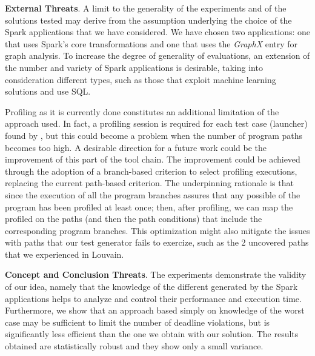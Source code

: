 \textbf{External Threats}. A limit to the generality of the experiments and of the solutions tested may derive from the assumption underlying the choice of the Spark applications that we have considered. We have chosen two applications: one that uses Spark's core transformations and one that uses the \textit{GraphX} entry for graph analysis. To increase the degree of generality of evaluations, an extension of the number and variety of Spark applications is desirable, taking into consideration different types, such as those that exploit machine learning solutions and use SQL.

Profiling as it is currently done constitutes an additional limitation of the approach used. In fact, a profiling session is required for each test case (launcher) found by \dSymb, but this could become a problem when the number of program paths becomes too high. A desirable direction for a future work could be the improvement of this part of the tool chain. The improvement could be achieved through the adoption of a branch-based criterion to select profiling executions, replacing the current path-based criterion. The underpinning rationale is that since the execution of all the program branches assures that any possible \plan of the program has been profiled at least once; then, after profiling, we can map the profiled \plans on the paths (and then the path conditions) that include the corresponding program branches. This optimization might also mitigate the issues with paths that our test generator fails to exercize, such as the 2 uncovered paths that we experienced in Louvain.

\textbf{Concept and Conclusion Threats}. The experiments demonstrate the validity of our idea, namely that the knowledge of the different \plans generated by the Spark applications helps to analyze and control their performance and execution time. Furthermore, we show that an approach based simply on knowledge of the worst case may be sufficient to limit the number of deadline violations, but is significantly less efficient than the one we obtain with our solution. The results obtained are statistically robust and they show only a small variance. 
